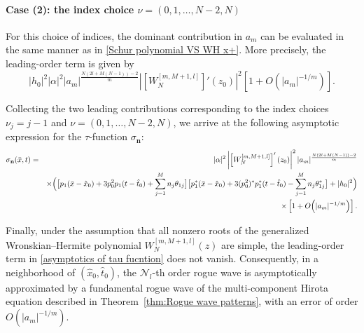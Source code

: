 \documentclass[preprint,3p,10pt]{elsarticle}
\theoremstyle{definition}
\begin{document}
\paragraph{Case (2): the index choice $\nu=(0,1,\ldots,N-2,N)$}
For this choice of indices, the dominant contribution in $a_m$ can be evaluated in the same manner as in
\eqref{Schur polynomial VS WH x+}. 
More precisely, the leading-order term is given by
\begin{equation}
  |h_0 |^2 |\alpha|^2
  |a_m|^{\frac{N(2l+M(N-1))-2}{m}}
  \left|\left[W_{N}^{[m,M+1,l]}\right]'(z_0)\right|^2
  \left[1+O\!\left(|a_m|^{-1/m}\right)\right].
\end{equation}


Collecting the two leading contributions corresponding to the index choices
$\nu_j=j-1$ and $\nu=(0,1,\ldots,N-2,N)$, we arrive at the following asymptotic expression for the
$\tau$-function $\sigma_{\mathbf{n}}$:
\begin{eqnarray}
  \sigma_{\mathbf{n}}(\bar x,t)
  &=&
  |\alpha|^2
  \left|
      \left[W_{N}^{[m,M+1,l]}\right]'(z_0)
  \right|^2
  |a_m|^{\frac{N(2l+M(N-1))-2}{m}}
  \nonumber\\
  && \times
  \Bigl(
      \bigl[
          p_1(\bar{x}-\hat{x}_0)
          +3p_0^2p_1(t-\hat{t}_0)
          +\sum_{j=1}^{M} n_j\theta_{1j}
      \bigr] 
      \bigl[
          p_1^{*}(\bar{x}-\hat{x}_0)+
          3(p_0^2)^*p_1^*(t-\hat{t}_0)
          -\sum_{j=1}^{M} n_j\theta_{1j}^{*}
      \bigr]
      +|h_0|^2
  \Bigr)
  \nonumber\\
  && \times
  \left[1+O\!\left(|a_m|^{-1/m}\right)\right].
  \label{asymptotics of tau fucntion}
\end{eqnarray}

Finally, under the assumption that all nonzero roots of the generalized Wronskian--Hermite polynomial
$W_{N}^{[m,M+1,l]}(z)$ are simple, the leading-order term in \eqref{asymptotics of tau fucntion}
does not vanish. 
Consequently, in a neighborhood of $(\hat{x}_0,\hat{t}_0)$, the $\mathcal{N}_l$-th order rogue wave is
asymptotically approximated by a fundamental rogue wave of the multi-component Hirota equation
described in Theorem~\ref{thm:Rogue wave patterns}, with an error of order
$O(|a_m|^{-1/m})$.
\end{document}
